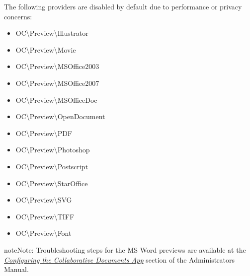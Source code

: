 \documentclass[letterpaper,10pt,english]{sphinxmanual}
\begin{document}
The following providers are disabled by default due to performance or privacy
concerns:
\begin{itemize}
\item {} 
OC\textbackslash{}Preview\textbackslash{}Illustrator

\item {} 
OC\textbackslash{}Preview\textbackslash{}Movie

\item {} 
OC\textbackslash{}Preview\textbackslash{}MSOffice2003

\item {} 
OC\textbackslash{}Preview\textbackslash{}MSOffice2007

\item {} 
OC\textbackslash{}Preview\textbackslash{}MSOfficeDoc

\item {} 
OC\textbackslash{}Preview\textbackslash{}OpenDocument

\item {} 
OC\textbackslash{}Preview\textbackslash{}PDF

\item {} 
OC\textbackslash{}Preview\textbackslash{}Photoshop

\item {} 
OC\textbackslash{}Preview\textbackslash{}Postscript

\item {} 
OC\textbackslash{}Preview\textbackslash{}StarOffice

\item {} 
OC\textbackslash{}Preview\textbackslash{}SVG

\item {} 
OC\textbackslash{}Preview\textbackslash{}TIFF

\item {} 
OC\textbackslash{}Preview\textbackslash{}Font

\end{itemize}

\begin{notice}{note}{Note:}
Troubleshooting steps for the MS Word previews are available
at the {\hyperref[configuration_files/collaborative_documents_configuration::doc]{\emph{\emph{Configuring the Collaborative Documents App}}}}
section of the Administrators Manual.
\end{notice}
\end{document}

